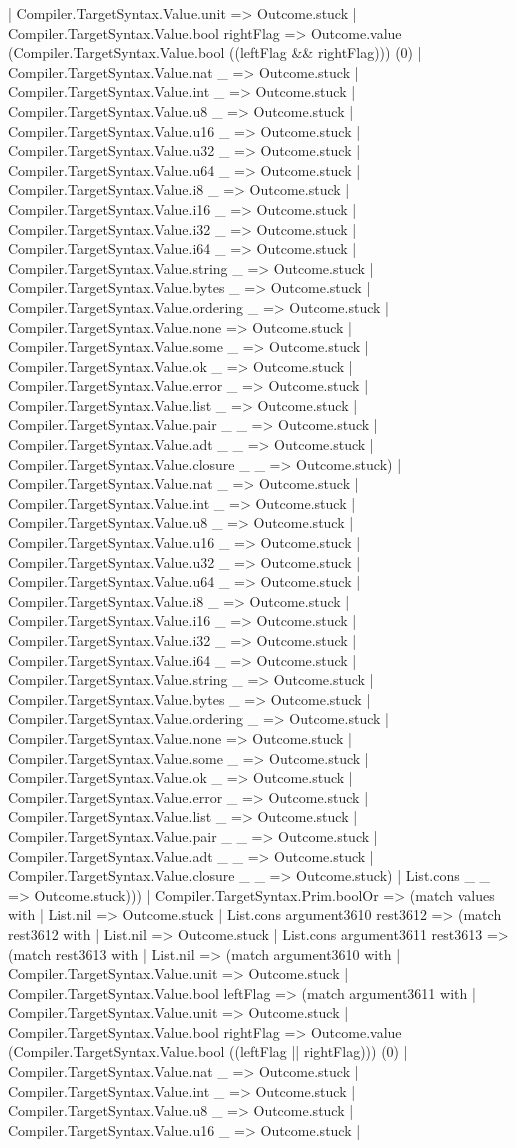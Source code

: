 \documentclass[11pt]{article}
\begin{document}
| Compiler.TargetSyntax.Value.unit => Outcome.stuck | Compiler.TargetSyntax.Value.bool rightFlag => Outcome.value (Compiler.TargetSyntax.Value.bool ((leftFlag \&\& rightFlag))) (0) | Compiler.TargetSyntax.Value.nat \_ => Outcome.stuck | Compiler.TargetSyntax.Value.int \_ => Outcome.stuck | Compiler.TargetSyntax.Value.u8 \_ => Outcome.stuck | Compiler.TargetSyntax.Value.u16 \_ => Outcome.stuck | Compiler.TargetSyntax.Value.u32 \_ => Outcome.stuck | Compiler.TargetSyntax.Value.u64 \_ => Outcome.stuck | Compiler.TargetSyntax.Value.i8 \_ => Outcome.stuck | Compiler.TargetSyntax.Value.i16 \_ => Outcome.stuck | Compiler.TargetSyntax.Value.i32 \_ => Outcome.stuck | Compiler.TargetSyntax.Value.i64 \_ => Outcome.stuck | Compiler.TargetSyntax.Value.string \_ => Outcome.stuck | Compiler.TargetSyntax.Value.bytes \_ => Outcome.stuck | Compiler.TargetSyntax.Value.ordering \_ => Outcome.stuck | Compiler.TargetSyntax.Value.none => Outcome.stuck | Compiler.TargetSyntax.Value.some \_ => Outcome.stuck | Compiler.TargetSyntax.Value.ok \_ => Outcome.stuck | Compiler.TargetSyntax.Value.error \_ => Outcome.stuck | Compiler.TargetSyntax.Value.list \_ => Outcome.stuck | Compiler.TargetSyntax.Value.pair \_ \_ => Outcome.stuck | Compiler.TargetSyntax.Value.adt \_ \_ => Outcome.stuck | Compiler.TargetSyntax.Value.closure \_ \_ => Outcome.stuck) | Compiler.TargetSyntax.Value.nat \_ => Outcome.stuck | Compiler.TargetSyntax.Value.int \_ => Outcome.stuck | Compiler.TargetSyntax.Value.u8 \_ => Outcome.stuck | Compiler.TargetSyntax.Value.u16 \_ => Outcome.stuck | Compiler.TargetSyntax.Value.u32 \_ => Outcome.stuck | Compiler.TargetSyntax.Value.u64 \_ => Outcome.stuck | Compiler.TargetSyntax.Value.i8 \_ => Outcome.stuck | Compiler.TargetSyntax.Value.i16 \_ => Outcome.stuck | Compiler.TargetSyntax.Value.i32 \_ => Outcome.stuck | Compiler.TargetSyntax.Value.i64 \_ => Outcome.stuck | Compiler.TargetSyntax.Value.string \_ => Outcome.stuck | Compiler.TargetSyntax.Value.bytes \_ => Outcome.stuck | Compiler.TargetSyntax.Value.ordering \_ => Outcome.stuck | Compiler.TargetSyntax.Value.none => Outcome.stuck | Compiler.TargetSyntax.Value.some \_ => Outcome.stuck | Compiler.TargetSyntax.Value.ok \_ => Outcome.stuck | Compiler.TargetSyntax.Value.error \_ => Outcome.stuck | Compiler.TargetSyntax.Value.list \_ => Outcome.stuck | Compiler.TargetSyntax.Value.pair \_ \_ => Outcome.stuck | Compiler.TargetSyntax.Value.adt \_ \_ => Outcome.stuck | Compiler.TargetSyntax.Value.closure \_ \_ => Outcome.stuck) | List.cons \_ \_ => Outcome.stuck))) | Compiler.TargetSyntax.Prim.boolOr => (match values with | List.nil => Outcome.stuck | List.cons argument3610 rest3612 => (match rest3612 with | List.nil => Outcome.stuck | List.cons argument3611 rest3613 => (match rest3613 with | List.nil => (match argument3610 with | Compiler.TargetSyntax.Value.unit => Outcome.stuck | Compiler.TargetSyntax.Value.bool leftFlag => (match argument3611 with | Compiler.TargetSyntax.Value.unit => Outcome.stuck | Compiler.TargetSyntax.Value.bool rightFlag => Outcome.value (Compiler.TargetSyntax.Value.bool ((leftFlag || rightFlag))) (0) | Compiler.TargetSyntax.Value.nat \_ => Outcome.stuck | Compiler.TargetSyntax.Value.int \_ => Outcome.stuck | Compiler.TargetSyntax.Value.u8 \_ => Outcome.stuck | Compiler.TargetSyntax.Value.u16 \_ => Outcome.stuck | 
\end{document}
